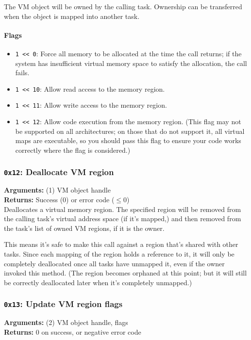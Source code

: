 \documentclass[11pt]{article}
\begin{document}
The VM object will be owned by the calling task. Ownership can be transferred when the object is mapped into another task.

\paragraph{Flags}
\begin{itemize}
\item \texttt{1 << 0}: Force all memory to be allocated at the time the call returns; if the system has insufficient virtual memory space to satisfy the allocation, the call fails.
\item \texttt{1 << 10}: Allow read access to the memory region.
\item \texttt{1 << 11}: Allow write access to the memory region.
\item \texttt{1 << 12}: Allow code execution from the memory region. (This flag may not be supported on all architectures; on those that do not support it, all virtual maps are executable, so you should pass this flag to ensure your code works correctly where the flag is considered.)
\end{itemize}

\subsubsection{{\tt 0x12}: Deallocate VM region}
\textbf{Arguments:} (1) VM object handle  \\
\textbf{Returns:} Success ($0$) or error code ($\leq0$) \\

Deallocates a virtual memory region. The specified region will be removed from the calling task's virtual address space (if it's mapped,) and then removed from the task's list of owned VM regions, if it is the owner.

This means it's safe to make this call against a region that's shared with other tasks. Since each mapping of the region holds a reference to it, it will only be completely deallocated once all tasks have unmapped it, even if the owner invoked this method. (The region becomes orphaned at this point; but it will still be correctly deallocated later when it's completely unmapped.)

\subsubsection{{\tt 0x13}: Update VM region flags}
\textbf{Arguments:} (2) VM object handle, flags \\
\textbf{Returns:} 0 on success, or negative error code \\
\end{document}
